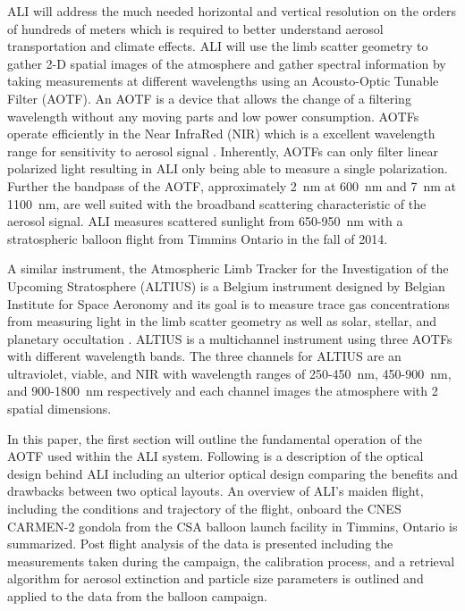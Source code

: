 \documentclass[12pt]{article}
\begin{document}
ALI will address the much needed horizontal and vertical resolution on the orders of hundreds of meters which is required to better understand aerosol transportation and climate 
effects. ALI will use the limb scatter geometry to gather 2-D spatial images of the atmosphere and gather spectral information by taking measurements at different wavelengths 
using an Acousto-Optic Tunable Filter (AOTF). An AOTF is a device that allows the change of a filtering wavelength without any moving parts and low power consumption. AOTFs 
operate efficiently in the Near InfraRed (NIR) which is a excellent wavelength range for sensitivity to aerosol signal \citep{Rieger2014}. Inherently, AOTFs can only filter 
linear polarized light resulting in ALI only being able to measure a single polarization. Further the bandpass of the AOTF, approximately 2~nm at 600~nm and 7~nm at 1100~nm, are 
well suited with the broadband scattering characteristic of the aerosol signal. ALI measures scattered sunlight from 650-950~nm with a stratospheric balloon flight from Timmins 
Ontario in the fall of 2014.

A similar instrument, the Atmospheric Limb Tracker for the Investigation of the Upcoming Stratosphere (ALTIUS) is a Belgium instrument designed by Belgian Institute for Space 
Aeronomy and its goal is to measure trace gas concentrations from measuring light in the limb scatter geometry as well as solar, stellar, and planetary occultation 
\citep{Dekemper2012}. ALTIUS is a multichannel instrument using three AOTFs with different wavelength bands. The three channels for ALTIUS are an ultraviolet, viable, and NIR 
with wavelength ranges of 250-450~nm, 450-900~nm, and 900-1800~nm respectively and each channel images the atmosphere with 2 spatial dimensions.

In this paper, the first section will outline the fundamental operation of the AOTF used within the ALI system. Following is a description of the optical design behind ALI 
including an ulterior optical design comparing the benefits and drawbacks between two optical layouts. An overview of ALI's maiden flight, including the conditions and 
trajectory of the flight, onboard the CNES CARMEN-2 gondola from the CSA balloon launch facility in Timmins, Ontario is summarized. Post flight analysis of the data is presented 
including the measurements taken during the campaign, the calibration process, and a retrieval algorithm for aerosol extinction and particle size parameters is outlined and 
applied to the data from the balloon campaign.
\end{document}
